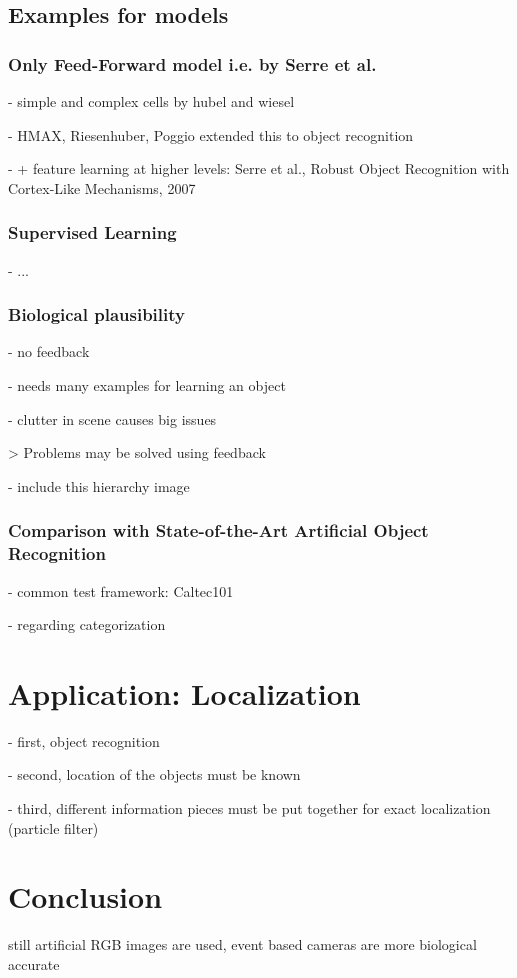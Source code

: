 	\section{Examples for models}
	
		\subsection{Only Feed-Forward model i.e. by Serre et al.}
		
			- simple and complex cells by hubel and wiesel
		
			- HMAX, Riesenhuber, Poggio extended this to object recognition
		
			- + feature learning at higher levels: Serre et al., Robust Object Recognition with Cortex-Like Mechanisms, 2007
			
		\subsection{Supervised Learning}
		
			- ...
		
		\subsection{Biological plausibility}
		
			- no feedback
			
			- needs many examples for learning an object
			
			- clutter in scene causes big issues
			
			> Problems may be solved using feedback

			- include this hierarchy image

		\subsection{Comparison with State-of-the-Art Artificial Object Recognition}
		
			- common test framework: Caltec101
		
			- regarding categorization
 
\chapter{Application: Localization}

	- first, object recognition
	
	- second, location of the objects must be known
	
	- third, different information pieces must be put together for exact localization (particle filter)


\chapter{Conclusion}

	still artificial RGB images are used, event based cameras are more biological accurate
	
